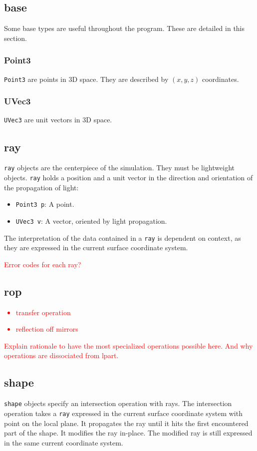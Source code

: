 \subsection{base}
Some base types are useful throughout the program. These are detailed in this
section.

\subsubsection{Point3}
\lstinline{Point3} are points in 3D space. They are described by $(x, y, z)$
coordinates.

\subsubsection{UVec3}
\lstinline{UVec3} are unit vectors in 3D space.

\subsection{ray}
\lstinline{ray} objects are the centerpiece of the simulation. They must be
lightweight objects.  \lstinline{ray} holds a position and a unit vector in the
direction and orientation of the propagation of light:

\begin{itemize}
\item \lstinline{Point3 p}: A point.
\item \lstinline{UVec3 v}: A vector, oriented by light propagation.
\end{itemize}

The interpretation of the data contained in a \lstinline{ray} is dependent
on context, as they are expressed in the current surface coordinate system.

\textcolor{red}{Error codes for each ray?}

\subsection{rop}

\textcolor{red}{
\begin{itemize}
\item transfer operation
\item reflection off mirrors
\end{itemize}
Explain rationale to have the most specialized operations possible here.
And why operations are dissociated from lpart.}

\subsection{shape}
\lstinline{shape} objects specify an intersection operation with rays.
The intersection operation takes a \lstinline{ray} expressed in the current
surface coordinate system with point on the local plane. It propagates
the ray until it hits the first encountered part of the shape. It modifies
the ray in-place. The modified ray is still expressed in the same current
coordinate system.

